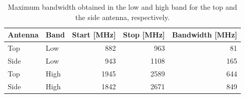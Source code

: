 \begin{table}
  \centering
  \begin{tabular}{|l|l|r|r|r|}
    \hline
    Antenna & Band & Start [MHz] & Stop [MHz] & Bandwidth [MHz] \\
    \hline
    Top     & Low  & 882         & 963       & 81 \\
    Side    & Low  & 943         & 1108        & 165 \\
    \hline
    Top     & High & 1945        & 2589       & 644 \\
    Side    & High & 1842        & 2671       & 849 \\
    \hline
  \end{tabular}
  \caption{Maximum bandwidth obtained in the low and high band for the top and the side antenna, respectively.}
  \label{tab:bw_mono_mini_meas}
\end{table}

